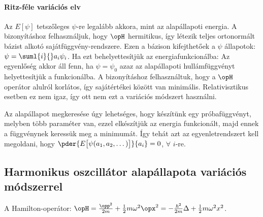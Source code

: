    \paragraph{Ritz-féle variációs elv}
    
    Az $E[\psi]$ tetszőleges $\psi$-re legalább akkora, mint az alapállapoti energia.
   A bizonyításhoz felhasználjuk, hogy $\opH$ hermitikus, így létezik teljes ortonormált bázist alkotó sajátfüggvény-rendszere.
   Ezen a bázison kifejthetőek a $\psi$ állapotok: $\psi=\suml{i}{}a_i\psi_i$.
   Ha ezt behelyettesítjük az energiafunkcionálba:
    Az egyenlőség akkor áll fenn, ha $\psi=\psi_0$ azaz az alapállapoti hullámfüggvényt helyettesítjük a funkcionálba.
   A bizonyításhoz felhasználtuk, hogy a $\opH$ operátor alulról korlátos, így sajátértékei között van minimális.
   Relativisztikus esetben ez nem igaz, így ott nem ezt a variációs módszert használni. 
    
    Az alapállapot megkeresése úgy lehetséges, hogy készítünk egy próbafüggvényt, melyben több paraméter van, ezzel elkészítjük az energia funkcionált, majd ennek a függvénynek keressük meg a minimumát. Így tehát azt az egyenletrendszert kell megoldani, hogy $\pder{E\big[\psi(a_1,a_2,\dots)\big]}{a_i}=0$, $\forall$ $i$-re. 
    
  \subsection{Harmonikus oszcillátor alapállapota variációs módszerrel}
   
   A Hamilton-operátor: $\opH=\frac{\opp^2}{2m}+\frac{1}{2}m\omega^2\opx^2=-\frac{\hbar^2}{2m}\Delta+\frac{1}{2}m\omega^2 x^2$.
   
